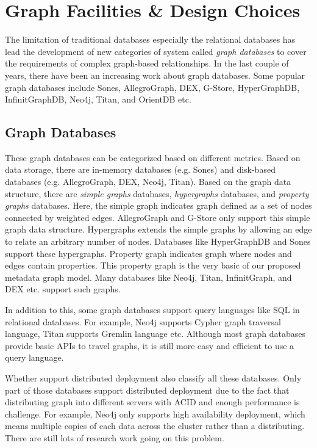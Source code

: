 \section{Graph Facilities \& Design Choices}

The limitation of traditional databases especially the relational databases has lead the development of new categories of system called \textit{graph databases} to cover the requirements of complex graph-based relationships. In the last couple of years, there have been an increasing work about graph databases. Some popular graph databases include Sones, AllegroGraph, DEX, G-Store, HyperGraphDB, InfinitGraphDB, Neo4j, Titan, and OrientDB etc.

\subsection{Graph Databases}
These graph databases can be categorized based on different metrics. Based on data storage, there are in-memory databases (e.g. Sones) and disk-based databases (e.g. AllegroGraph, DEX, Neo4j, Titan). Based on the graph data structure, there are \textit{simple graphs} databases, \textit{hypergraphs} databases, and \textit{property graphs} databases. Here, the simple graph indicates graph defined as a set of nodes connected by weighted edges. AllegroGraph and G-Store only support this simple graph data structure. Hypergraphs extends the simple graphs by allowing an edge to relate an arbitrary number of nodes. Databases like HyperGraphDB and Sones support these hypergraphs. Property graph indicates graph where nodes and edges contain properties. This property graph is the very basic of our proposed metadata graph model. Many databases like Neo4j, Titan, InfinitGraph, and DEX etc. support such graphs. 

In addition to this, some graph databases support query languages like SQL in relational databases. For example, Neo4j supports Cypher graph traversal language, Titan supports Gremlin language etc. Although most graph databases provide basic APIs to travel graphs, it is still more easy and efficient to use a query language. 

Whether support distributed deployment also classify all these databases. Only part of those databases support distributed deployment due to the fact that distributing graph into different servers with ACID and enough performance is challenge. For example, Neo4j only supports high availability deployment, which means multiple copies of each data across the cluster rather than a distributing. There are still lots of research work going on this problem.

